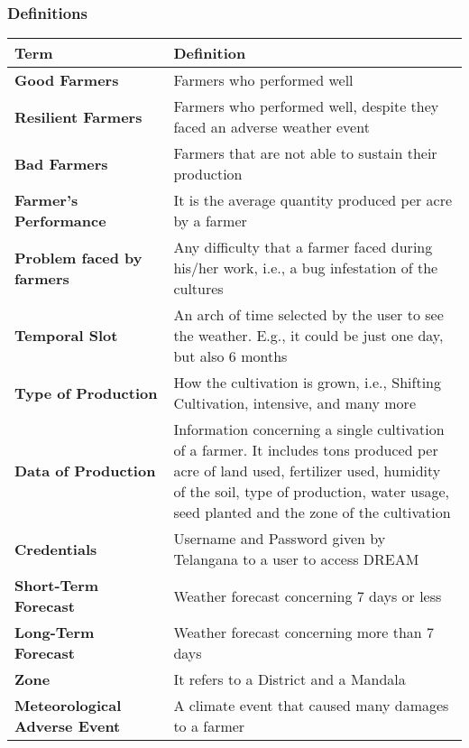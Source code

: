 \subsubsection{Definitions}
\begin{center}
    \begin{tabular}{@{}p{0.35\linewidth} p{0.65\linewidth}}
        \hline
        \textbf{Term} & \textbf{Definition}\\
        \hline
        \textbf{Good Farmers} & Farmers who performed well\\
        \textbf{Resilient Farmers} & Farmers who performed well, despite they faced an adverse weather event\\
        \textbf{Bad Farmers} & Farmers that are not able to sustain their production\\
        \textbf{Farmer’s Performance} & It is the average quantity produced per acre by a farmer\\
        \textbf{Problem faced by farmers} & Any difficulty that a farmer faced during his/her work, i.e., a bug infestation of the cultures\\
        \textbf{Temporal Slot} & An arch of time selected by the user to see the weather. E.g., it could be just one day, but also 6 months\\
        \textbf{Type of Production} & How the cultivation is grown, i.e., Shifting Cultivation, intensive, and many more\\
        \textbf{Data of Production} & Information concerning a single cultivation of a farmer. It includes tons produced per acre of land used, fertilizer used, humidity of the soil, type of production, water usage, seed planted and the zone of the cultivation\\
        \textbf{Credentials} & Username and Password given by Telangana to a user to access DREAM\\
        \textbf{Short-Term Forecast} & Weather forecast concerning 7 days or less\\
        \textbf{Long-Term Forecast} & Weather forecast concerning more than 7 days\\
        \textbf{Zone} & It refers to a District and a Mandala\\
        \textbf{Meteorological Adverse Event} & A climate event that caused many damages to a farmer\\
        \hline
    \end{tabular}
\end{center}


